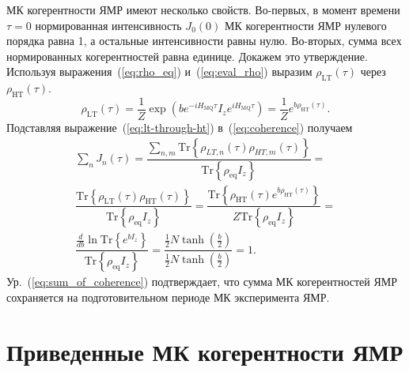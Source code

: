 МК когерентности ЯМР имеют несколько свойств.
Во-первых, в момент времени  $\tau=0$
нормированная интенсивность $J_0(0)$ МК когерентности ЯМР нулевого порядка равна 1,
а остальные интенсивности равны нулю.
Во-вторых, сумма всех нормированных когерентностей равна единице.
Докажем это утверждение.
Используя выражения~(\ref{eq:rho_eq}) и~(\ref{eq:eval_rho})
выразим $\rho_\mathrm{LT}(\tau)$ через $\rho_\mathrm{HT}(\tau)$.
%
\begin{equation}\label{eq:lt-through-ht}
  \rho_\mathrm{LT}(\tau) = \dfrac 1 Z
  \exp\left(be^{-iH_\mathrm{MQ}\tau} I_z e^{iH_\mathrm{MQ}\tau}\right) =
  \dfrac 1 Z e^{b\rho_\mathrm{HT}(\tau)}.
\end{equation}
%
Подставляя выражение~(\ref{eq:lt-through-ht}) в~(\ref{eq:coherence}) получаем
%
\begin{multline}
  \label{eq:sum_of_coherence}
  \sum\limits_n J_n(\tau) =
  \dfrac{\sum\limits_{n, m}\mathrm{Tr}\left\{
      \rho_{LT, n}(\tau)\rho_{HT, m}(\tau)
  \right\}}
  {\mathrm{Tr}\left\{\rho_\mathrm{eq} I_z\right\}} = \\
  \dfrac{\mathrm{Tr}\left\{
      \rho_\mathrm{LT}(\tau)\rho_\mathrm{HT}(\tau)
  \right\}}
  {\mathrm{Tr}\left\{\rho_\mathrm{eq} I_z\right\}} =
  \dfrac{\mathrm{Tr}\left\{
      \rho_\mathrm{HT}(\tau)e^{b\rho_\mathrm{HT}(\tau)}
  \right\}}
  {Z\mathrm{Tr}\left\{\rho_\mathrm{eq} I_z\right\}} = \\
  \dfrac{\frac{d}{db} \ln \mathrm{Tr}\left\{
      e^{b I_z}
  \right\}}
  {\mathrm{Tr}\left\{\rho_\mathrm{eq} I_z\right\}} =
  \dfrac{\frac 1 2 N \tanh \left( \frac b 2 \right)}
  {\frac 1 2 N \tanh \left( \frac b 2 \right)} = 1.
\end{multline}
Ур.~(\ref{eq:sum_of_coherence}) подтверждает,
что сумма МК когерентностей ЯМР сохраняется на подготовительном периоде МК эксперимента ЯМР.


\section{Приведенные МК когерентности ЯМР}
\label{sec:reduced-mq-coherences}

